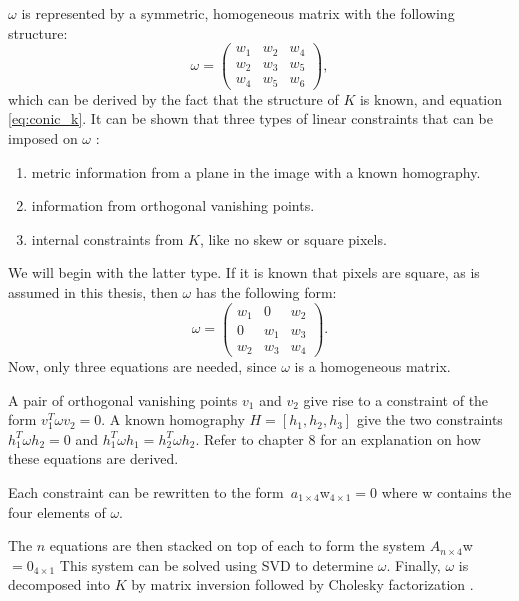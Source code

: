 $\omega$ is represented by a symmetric, homogeneous matrix with the following structure:
$$
\omega = \begin{pmatrix}
	w_{1} & w_{2} & w_{4} \\
	w_{2} & w_{3} & w_{5} \\
	w_{4} & w_{5} & w_{6} 
\end{pmatrix},
$$
which can be derived by the fact that the structure of $K$ is known, and equation \ref{eq:conic_k}.
It can be shown that three types of linear constraints that can be imposed on $\omega$ \cite[224]{hartley-zisserman}:
\begin{enumerate}
	\item metric information from a plane in the image with a known homography.
	\item information from orthogonal vanishing points.
	\item internal constraints from $K$, like no skew or square pixels.
\end{enumerate}

We will begin with the latter type.
If it is known that pixels are square, as is assumed in this thesis, then $\omega$ has the following form:
$$
\omega = \begin{pmatrix}
	w_{1} & 0 & w_{2} \\
	0 & w_{1} & w_{3} \\
	w_{2} & w_{3} & w_{4}
\end{pmatrix}.
$$
Now, only three equations are needed, since $\omega$ is a homogeneous matrix.

A pair of orthogonal vanishing points $v_1$ and $v_2$ give rise to a constraint of the form $v_{1}^T \omega v_{2} = 0$.
A known homography $H=[h_{1},h_{2},h_{3}]$ give the two constraints $h_{1}^T \omega h_{2} = 0$ and $h_{1}^T \omega h_{1} = h_{2}^T \omega h_{2}$. Refer to \cite{hartley-zisserman} chapter 8 for an explanation on how these equations are derived.

Each constraint can be rewritten to the form $a_{1 \times 4}$w$_{4 \times 1}=0$ where w contains the four elements of $\omega$.

The $n$ equations are then stacked on top of each to form the system $A_{n \times 4}$w$=0_{4 \times 1}$
This system can be solved using SVD to determine $\omega$.
Finally, $\omega$ is decomposed into $K$ by matrix inversion followed by Cholesky factorization \cite[p. 223-226]{hartley-zisserman}. 

